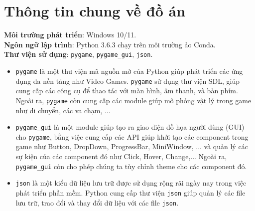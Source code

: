 \section{Thông tin chung về đồ án}
\textbf{Môi trường phát triển}: Windows 10/11.\\
\textbf{Ngôn ngữ lập trình}: Python \(3.6.3\) chạy trên môi trường ảo Conda.\\
\textbf{Thư viện sử dụng}: \verb|pygame|, \verb|pygame_gui|, \verb|json|.
\begin{itemize}
  \item \verb|pygame| là một thư viện mã nguồn mở của Python giúp phát triển các ứng dụng đa nền tảng như Video Games. \verb|pygame| sử dụng thư viện SDL, giúp cung cấp các công cụ để thao tác với màn hình, âm thanh, và bàn phím. Ngoài ra, \verb|pygame| còn cung cấp các module giúp mô phỏng vật lý trong game như di chuyển, các va chạm, ...
  \item \verb|pygame_gui| là một module giúp tạo ra giao diện đồ họa người dùng (GUI) cho \verb|pygame|, bằng việc cung cấp các API giúp khởi tạo các component trong game như Button, DropDown, ProgressBar, MiniWindow, ... và quản lý các sự kiện của các component đó như Click, Hover, Change,... Ngoài ra, \verb|pygame_gui| còn cho phép chúng ta tùy chỉnh theme cho các component đó.
  \item \verb|json| là một kiểu dữ liệu lưu trữ được sử dụng rộng rãi ngày nay trong việc phát triển phần mềm. Python cung cấp thư viện \verb|json| giúp quản lý các file lưu trữ, trao đổi và thay đổi dữ liệu với các file \verb|json|.
\end{itemize}

